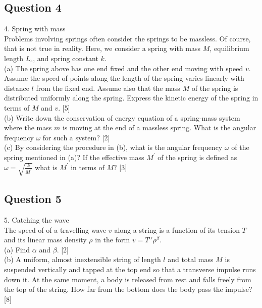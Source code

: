 \documentclass{article}
\begin{document}
\subsection{Question 4}
4. Spring with mass \\ Problems involving springs often consider the springs to be massless. Of course, that is not true in reality. Here, we consider a spring with mass $M$, equilibrium length $L_{\circ}$, and spring constant $k$. \\
(a) The spring above has one end fixed and the other end moving with speed $v$. Assume the speed of points along the length of the spring varies linearly with distance $l$ from the fixed end. Assume also that the mass $M$ of the spring is distributed uniformly along the spring. Express the kinetic energy of the spring in terms of $M$ and $v$. [5] \\
(b) Write down the conservation of energy equation of a spring-mass system where the mass $m$ is moving at the end of a massless spring. What is the angular frequency $\omega$ for such a system? [2] \\
(c) By considering the procedure in (b), what is the angular frequency $\omega$ of the spring mentioned in (a)? If the effective mass $M^{\prime}$ of the spring is defined as $\omega=\sqrt{\frac{k}{M^{\prime}}}$ what is $M^{\prime}$ in terms of $M ?$ [3]

\subsection{Question 5}
5. Catching the wave \\
The speed of of a travelling wave $v$ along a string is a function of its tension $T$ and its linear mass density $\rho$ in the form $v=T^{\alpha} \rho^{\beta}$. \\
(a) Find $\alpha$ and $\beta$. [2] \\
(b) A uniform, almost inextensible string of length $l$ and total mass $M$ is suspended vertically and tapped at the top end so that a transverse impulse runs down it. At the same moment, a body is released from rest and falls freely from the top of the string. How far from the bottom does the body pass the impulse? [8]
\end{document}
